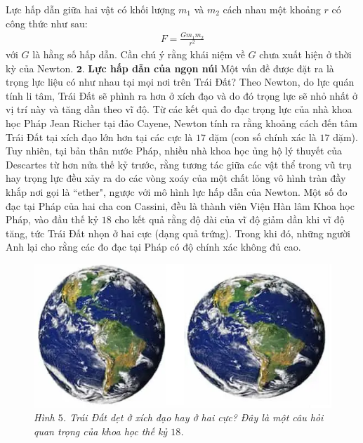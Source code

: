 \begin{multicols}{2}
	\vskip 0.1cm
	Lực hấp dẫn giữa hai vật có khối lượng $m_1$ và $m_2$ cách nhau một khoảng $r$ có công thức như sau:
	\begin{align*}
		F =\frac{Gm_1m_2}{r^2}
	\end{align*}
	với $G$ là hằng số hấp dẫn. Cần chú ý rằng khái niệm về $G$ chưa xuất hiện ở thời kỳ của Newton.
	\vskip 0.1cm
	$\pmb{2.}$ \textbf{\color{timhieukhoahoc}Lực hấp dẫn của ngọn núi}
	\vskip 0.1cm
	Một vấn đề được đặt ra là trọng lực liệu có như nhau tại mọi nơi trên Trái Đất? Theo Newton, do lực quán tính li tâm, Trái Đất sẽ phình ra hơn ở xích đạo và do đó trọng lực sẽ nhỏ nhất ở vị trí này và tăng dần theo vĩ độ. Từ các kết quả đo đạc trọng lực của nhà khoa học Pháp Jean Richer tại đảo Cayene, Newton tính ra rằng khoảng cách đến tâm Trái Đất tại xích đạo lớn hơn tại các cực là $17$ dặm (con số chính xác là $17$ dặm).
	\vskip 0.1cm
	Tuy nhiên, tại bản thân nước Pháp, nhiều nhà khoa học ủng hộ lý thuyết của Descartes từ hơn nửa thế kỷ trước, rằng tương tác giữa các vật thể trong vũ trụ hay trọng lực đều xảy ra do các vòng xoáy của một chất lỏng vô hình tràn đầy khắp nơi gọi là ``ether", ngược với mô hình lực hấp dẫn của Newton. Một số đo đạc tại Pháp của hai cha con Cassini, đều là thành viên Viện Hàn lâm Khoa học Pháp, vào đầu thế kỷ $18$ cho kết quả rằng độ dài của vĩ độ giảm dần khi vĩ độ tăng, tức Trái Đất nhọn ở hai cực (dạng quả trứng). Trong khi đó, những người Anh lại cho rằng các đo đạc tại Pháp có độ chính xác không đủ cao.
	\begin{figure}[H]
		\vspace*{-6pt}
		\centering
		\captionsetup{labelformat= empty, justification=centering}
		\includegraphics[width =1\linewidth]{5}
		\caption{\small\textit{\color{timhieukhoahoc}Hình $5$. Trái Đất dẹt ở xích đạo hay ở hai cực? Đây là một câu hỏi quan trọng của khoa học thế kỷ $18$.}}
		\vspace*{-10pt}

\end{figure}
\end{multicols}
